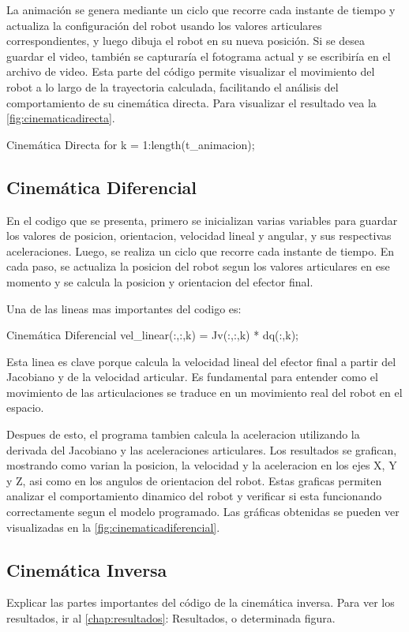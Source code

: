 La animación se genera mediante un ciclo que recorre cada instante de tiempo y actualiza la configuración del robot usando los valores articulares correspondientes, y luego dibuja el robot en su nueva posición. Si se desea guardar el video, también se capturaría el fotograma actual y se escribiría en el archivo de video. Esta parte del código permite visualizar el movimiento del robot a lo largo de la trayectoria calculada, facilitando el análisis del comportamiento de su cinemática directa. Para visualizar el resultado vea la \autoref{fig:cinematicadirecta}.

\begin{matlabcode}{Cinemática Directa}
	for k = 1:length(t_animacion);
\end{matlabcode}


\subsection{Cinemática Diferencial}

En el codigo que se presenta, primero se inicializan varias variables para guardar los valores de posicion, orientacion, velocidad lineal y angular, y sus respectivas aceleraciones. Luego, se realiza un ciclo que recorre cada instante de tiempo. En cada paso, se actualiza la posicion del robot segun los valores articulares en ese momento y se calcula la posicion y orientacion del efector final.

Una de las lineas mas importantes del codigo es:
\begin{matlabcode}{Cinemática Diferencial}
	vel_linear(:,:,k) = Jv(:,:,k) * dq(:,k);
\end{matlabcode}

Esta linea es clave porque calcula la velocidad lineal del efector final a partir del Jacobiano y de la velocidad articular. Es fundamental para entender como el movimiento de las articulaciones se traduce en un movimiento real del robot en el espacio.

Despues de esto, el programa tambien calcula la aceleracion utilizando la derivada del Jacobiano y las aceleraciones articulares. Los resultados se grafican, mostrando como varian la posicion, la velocidad y la aceleracion en los ejes X, Y y Z, asi como en los angulos de orientacion del robot. Estas graficas permiten analizar el comportamiento dinamico del robot y verificar si esta funcionando correctamente segun el modelo programado. Las gráficas obtenidas se pueden ver visualizadas en la  \autoref{fig:cinematicadiferencial}.

\subsection{Cinemática Inversa}
Explicar las partes importantes del código de la cinemática inversa.
Para ver los resultados, ir al \autoref{chap:resultados}: Resultados, o determinada figura.